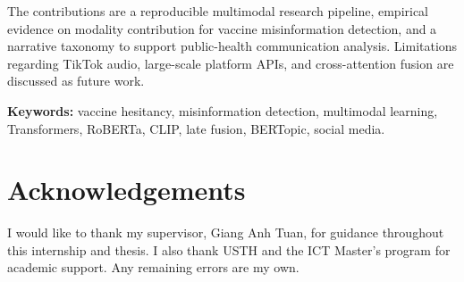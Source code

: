 \documentclass[12pt,a4paper,oneside]{report}
\newcommand{\supervisor}{Giang Anh Tuan}
\begin{document}
The contributions are a reproducible multimodal research pipeline, empirical evidence on modality contribution for vaccine misinformation detection, and a narrative taxonomy to support public-health communication analysis.
Limitations regarding TikTok audio, large-scale platform APIs, and cross-attention fusion are discussed as future work.

\vspace{1em}
\noindent\textbf{Keywords:} vaccine hesitancy, misinformation detection, multimodal learning, Transformers, RoBERTa, CLIP, late fusion, BERTopic, social media.

\chapter*{Acknowledgements}
I would like to thank my supervisor, \supervisor, for guidance throughout this internship and thesis.
I also thank USTH and the ICT Master's program for academic support.
Any remaining errors are my own.

\tableofcontents
\listoffigures
\listoftables

\clearpage
{}









\printbibliography[heading=bibintoc,title=References]

\appendix

\end{document}
